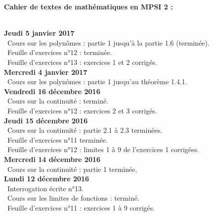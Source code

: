 \documentclass[12pt,a4paper]{article}
\begin{document}
\begin{center}
\Large\bf Cahier de textes de mathématiques en MPSI 2 :
\end{center}
\vspace{1cm}
\vspace{.4cm}\\

\noindent\textbf{Jeudi 5 janvier 2017}\\
\bu\ Cours sur les polynômes : partie  1 jusqu'à la partie 1.6 (terminée).\\
\bu\ Feuille d'exercices n°12 : terminée.\\
\bu\ Feuille d'exercices n°13 : exercices 1 et 2 corrigés.\vspace{.4cm}\\

\noindent\textbf{Mercredi 4 janvier 2017}\\
\bu\ Cours sur les polynômes : partie  1 jusqu'au théorème 1.4.1.\vspace{.4cm}\\

\noindent\textbf{Vendredi 16 décembre 2016}\\
\bu\ Cours sur la continuité : terminé.\\
\bu\ Feuille d'exercices n°12 : exercices 2 et 3 corrigés.\vspace{.4cm}\\

\noindent\textbf{Jeudi 15 décembre 2016}\\
\bu\ Cours sur la continuité : partie 2.1 à 2.3 terminées.\\
\bu\ Feuille d'exercices n°11 terminée.\\
\bu\ Feuille d'exercices n°12 : limites 1 à 9 de l'exercices 1 corrigées.\vspace{.4cm}\\

\noindent\textbf{Mercredi 14 décembre 2016}\\
\bu\ Cours sur la continuité : partie 1 terminée. \vspace{.4cm}\\

\noindent\textbf{Lundi 12 décembre 2016}\\
\bu\ Interrogation écrite n°13.\\
\bu\ Cours sur les limites de fonctions : terminé.\\
\bu\ Feuille d'exercices n°11 : exercices 1 à 9 corrigés. \vspace{.4cm}\\
\end{document}
